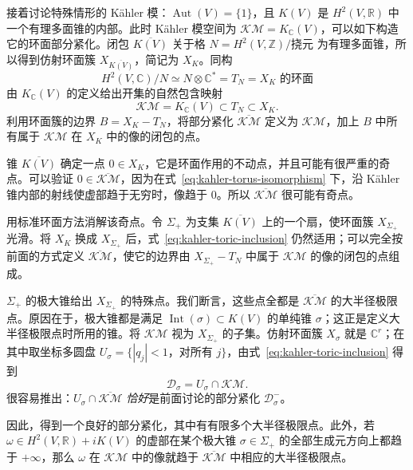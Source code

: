 接着讨论特殊情形的 Kähler 模：$\operatorname{Aut}(V)=\{1\}$，且 $K(V)$ 是 $H^2(V,\mathbb R)$ 中一个有理多面锥的内部。此时 Kähler 模空间为 $\mathcal{KM}=K_{\mathbb C}(V)$，可以如下构造它的环面部分紧化。闭包 $\overline{K(V)}$ 关于格 $N=H^2(V,\mathbb Z)/\text{挠元}$ 为有理多面锥，所以得到仿射环面簇 $X_{\overline{K(V)}}$，简记为 $X_K$。同构
\begin{equation}\label{eq:kahler-torus-isomorphism}
H^2(V,\mathbb C)/N\simeq N\otimes\mathbb C^*=T_N=X_K\text{ 的环面}
\end{equation}
由 $K_{\mathbb C}(V)$ 的定义给出开集的自然包含映射
\begin{equation}\label{eq:kahler-toric-inclusion}
\mathcal{KM}=K_{\mathbb C}(V)\subset T_N\subset X_K.
\end{equation}
利用环面簇的边界 $B=X_K-T_N$，将部分紧化 $\overline{\mathcal{KM}}$ 定义为 $\mathcal{KM}$，加上 $B$ 中所有属于 $\mathcal{KM}$ 在 $X_K$ 中的像的闭包的点。

锥 $\overline{K(V)}$ 确定一点 $0\in X_K$，它是环面作用的不动点，并且可能有很严重的奇点。可以验证 $0\in\overline{\mathcal{KM}}$，因为在式~\eqref{eq:kahler-torus-isomorphism} 下，沿 Kähler 锥内部的射线使虚部趋于无穷时，像趋于 $0$。所以 $\overline{\mathcal{KM}}$ 很可能有奇点。

用标准环面方法消解该奇点。令 $\Sigma_+$ 为支集 $\overline{K(V)}$ 上的一个扇，使环面簇 $X_{\Sigma_+}$ 光滑。将 $X_K$ 换成 $X_{\Sigma_+}$ 后，式~\eqref{eq:kahler-toric-inclusion} 仍然适用；可以完全按前面的方式定义 $\overline{\mathcal{KM}}$，使它的边界由 $X_{\Sigma_+}-T_N$ 中属于 $\mathcal{KM}$ 的像的闭包的点组成。

$\Sigma_+$ 的极大锥给出 $X_{\Sigma_+}$ 的特殊点。我们断言，这些点全都是 $\overline{\mathcal{KM}}$ 的大半径极限点。原因在于，极大锥都是满足 $\operatorname{Int}(\sigma)\subset K(V)$ 的单纯锥 $\sigma$；这正是定义大半径极限点时所用的锥。将 $\mathcal{KM}$ 视为 $X_{\Sigma_+}$ 的子集。仿射环面簇 $X_\sigma$ 就是 $\mathbb C^r$；在其中取坐标多圆盘 $U_\sigma=\{|q_j|<1\text{，对所有 }j\}$，由式~\eqref{eq:kahler-toric-inclusion} 得到
\[
\mathcal D_\sigma=U_\sigma\cap\mathcal{KM}.
\]
很容易推出：$U_\sigma\cap\overline{\mathcal{KM}}$ \emph{恰好}是前面讨论的部分紧化 $\mathcal D_\sigma^-$。

因此，得到一个良好的部分紧化，其中有有限多个大半径极限点。此外，若 $\omega\in H^2(V,\mathbb R)+iK(V)$ 的虚部在某个极大锥 $\sigma\in\Sigma_+$ 的全部生成元方向上都趋于 $+\infty$，那么 $\omega$ 在 $\mathcal{KM}$ 中的像就趋于 $\overline{\mathcal{KM}}$ 中相应的大半径极限点。

